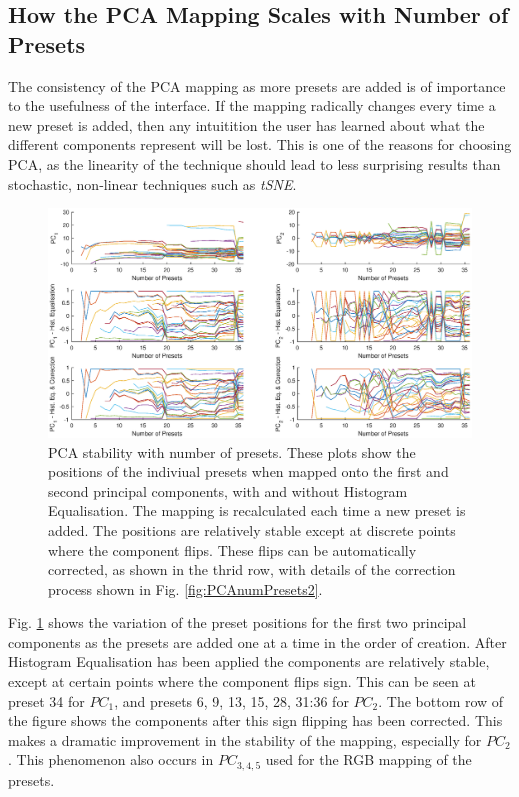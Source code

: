\documentclass[11pt, oneside]{report}   	%
\begin{document}
\subsection{How the PCA Mapping Scales with Number of Presets}\label{sec:PCAmappingScale}
The consistency of the PCA mapping as more presets are added is of importance to the usefulness of the interface. If the mapping radically changes every time a new preset is added, then any intuitition the user has learned about what the different components represent will be lost. This is one of the reasons for choosing PCA, as the linearity of the technique should lead to less surprising results than stochastic, non-linear techniques such as \emph{tSNE}.\\
\begin{figure}[h]
	\hspace{-80pt}
	\includegraphics[trim={0, 1cm, 0, 1cm}, clip, width = 8.5in]{PCAnumPresets1.eps}
	\caption{PCA stability with number of presets. These plots show the positions of the indiviual presets when mapped onto the first and second principal components, with and without Histogram Equalisation. The mapping is recalculated each time a new preset is added. The positions are relatively stable except at discrete points where the component flips. These flips can be automatically corrected, as shown in the thrid row, with details of the correction process shown in Fig. \ref{fig:PCAnumPresets2}.}
	\label{fig:PCAnumPresets}
		\vspace{-10pt}
\end{figure}
Fig. \ref{fig:PCAnumPresets} shows the variation of the preset positions for the first two principal components as the presets are added one at a time in the order of creation. After Histogram Equalisation has been applied the components are relatively stable, except at certain points where the component flips sign. This can be seen at preset 34 for $PC_1$, and presets 6, 9, 13, 15, 28, 31:36 for $PC_2$. The bottom row of the figure shows the components after this sign flipping has been corrected. This makes a dramatic improvement in the stability of the mapping, especially for $PC_2$. This phenomenon also occurs in $PC_{3,4,5}$ used for the RGB mapping of the presets.
\end{document}
